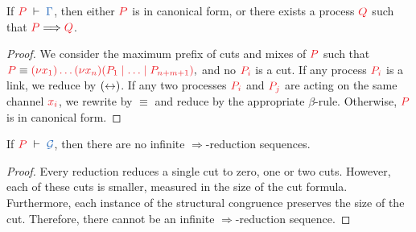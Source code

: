 \documentclass[envcountsame,UKenglish]{llncs}
\begin{document}
\begin{theorem}[Progress]\label{thm:hcp-progress}
  If $\seq[P]{\Gamma}$, then either $\tm{P}$ is in canonical form, or there exists a process $\tm{Q}$ such that $\tm{P}\Longrightarrow\tm{Q}$.
\end{theorem} 
\begin{proof}
  We consider the maximum prefix of cuts and mixes of $\tm{P}$ such that
  \(
  \tm{P} \equiv \tm{\piNew{x_1}{\dots\piNew{x_n}{(P_1 \ppar \dots \ppar P_{n+m+1})}}},
  \)
  and no $\tm{P_i}$ is a cut. If any process $\tm{P_i}$ is a link, we reduce by $({\leftrightarrow})$. If any two processes $\tm{P_i}$ and $\tm{P_j}$ are acting on the same channel $\tm{x_i}$, we rewrite by $\equiv$ and reduce by the appropriate $\beta$-rule. Otherwise, $\tm{P}$ is in canonical form.
\end{proof}
\begin{theorem}[Termination]\label{thm:hcp-termination}
  If $\seq[P]{\mathcal{G}}$, then there are no infinite $\Longrightarrow$-reduction sequences.
\end{theorem} 
\begin{proof}
  Every reduction reduces a single cut to zero, one or two cuts. However, each of these cuts is smaller, measured in the size of the cut formula. Furthermore, each instance of the structural congruence preserves the size of the cut. Therefore, there cannot be an infinite $\Longrightarrow$-reduction sequence.
\end{proof}
\end{document}
